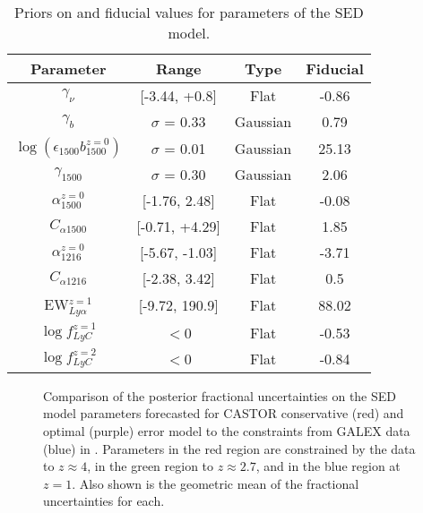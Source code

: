 \documentclass[fleqn,usenatbib]{mnras}
\begin{document}
\begin{table}
  \begin{center}
  \caption{Priors on and fiducial values for parameters of the SED model.\label{tab:table1}}
    \begin{tabular}{c c c c}
      \textbf{Parameter} & \textbf{Range} & \textbf{Type} & \textbf{Fiducial}\\
      \hline
      $\gamma_{\nu}$ & [-3.44, +0.8]& Flat & -0.86\\ %
      $\gamma_{b}$ & $\sigma$ = 0.33 &  Gaussian & 0.79\\ %
      $\log(\epsilon_{1500} b_{1500}^{z=0})$ & $\sigma$ = 0.01 & Gaussian & 25.13 \\
      $\gamma_{1500}$ & $\sigma$ = 0.30 & Gaussian & 2.06\\%
      $\alpha_{1500}^{z=0}$ & [-1.76, 2.48] & Flat &  -0.08\\
      $C_{\alpha 1500}$ & [-0.71, +4.29] & Flat & 1.85\\
      $\alpha_{1216}^{z=0}$ & [-5.67, -1.03] & Flat & -3.71 \\
      $C_{\alpha 1216}$ & [-2.38, 3.42] & Flat & 0.5\\
      EW$_{Ly\alpha}^{z=1}$ & [-9.72, 190.9] & Flat & 88.02\\
      $\log f^{z=1}_{LyC}$ & $<$0 & Flat & -0.53\\
      $\log f^{z=2}_{LyC}$ & $<$0 & Flat & -0.84\\
    \end{tabular}
  \end{center}
\end{table}


\begin{figure}
\caption{ \label{SED_comparison} Comparison of the posterior fractional uncertainties on the SED model parameters forecasted for {\small CASTOR} conservative (red) and optimal (purple) error model to the constraints from GALEX data (blue) in \citep{Chiang_2019}. Parameters in the red region are constrained by the data to $z \approx 4$, in the green region to $z \approx 2.7$, and in the blue region at $z = 1$. Also shown is the geometric mean of the fractional uncertainties for each.} 
\end{figure}
\end{document}
